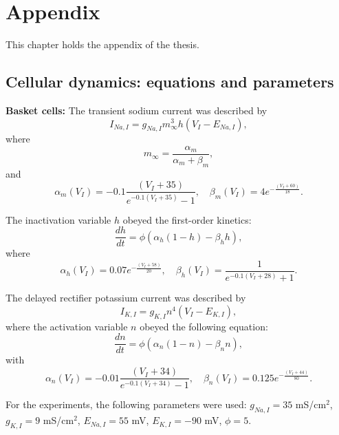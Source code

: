 \chapter{Appendix}

This chapter holds the appendix of the thesis.

\section{Cellular dynamics: equations and parameters}
\textbf{Basket cells:}
The transient sodium current was described by
\[
    I_{Na,I} = g_{Na,I} m_{\infty}^3 h (V_I - E_{Na,I}),
\]
where
\[
    m_{\infty} = \frac{\alpha_m}{\alpha_m + \beta_m},
\]
and
\[
    \alpha_m(V_I) = -0.1 \frac{(V_I + 35)}{e^{-0.1(V_I+35)} - 1}, \quad \beta_m(V_I) = 4e^{-\frac{(V_I+60)}{18}}.
\]

The inactivation variable \( h \) obeyed the first-order kinetics:
\[
    \frac{dh}{dt} = \phi(\alpha_h (1 - h) - \beta_h h),
\]
where
\[
    \alpha_h(V_I) = 0.07 e^{-\frac{(V_I+58)}{20}}, \quad \beta_h(V_I) = \frac{1}{e^{- 0.1(V_I+28)} + 1}.
\]

The delayed rectifier potassium current was described by
\[
    I_{K,I} = g_{K,I} n^4 (V_I - E_{K,I}),
\]
where the activation variable \( n \) obeyed the following equation:
\[
    \frac{dn}{dt} = \phi(\alpha_n (1 - n) - \beta_n n),
\]
with
\[
    \alpha_n(V_I) = -0.01 \frac{(V_I + 34)}{e^{-0.1(V_I+34)} - 1}, \quad \beta_n(V_I) = 0.125 e^{-\frac{(V_I+44)}{80}}.
\]

For the experiments, the following parameters were used: \( g_{Na,I} = 35 \)
mS/cm\(^2\), \( g_{K,I} = 9 \) mS/cm\(^2\), \( E_{Na,I} = 55 \) mV, \( E_{K,I}
= -90 \) mV, \( \phi = 5 \).\pagebreak

